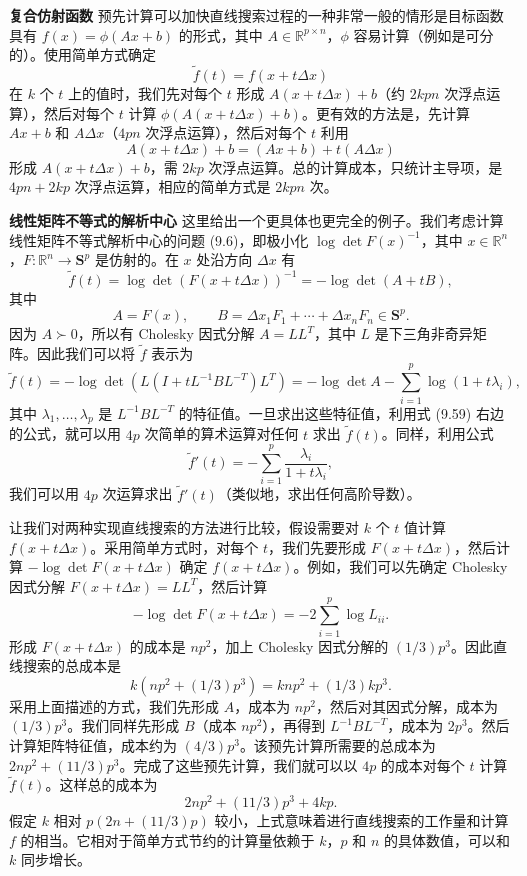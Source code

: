 \documentclass[UTF8, 12pt, fontset=fandol, oneside]{ctexart}
\begin{document}
\noindent\textbf{复合仿射函数}\quad
预先计算可以加快直线搜索过程的一种非常一般的情形是目标函数具有 $f(x)=\phi(Ax+b)$ 的形式，其中 $A\in\mathbb{R}^{p\times n}$，$\phi$ 容易计算（例如是可分的）。使用简单方式确定
\[
\tilde{f}(t)=f(x+t\Delta x)
\]
在 $k$ 个 $t$ 上的值时，我们先对每个 $t$ 形成 $A(x+t\Delta x)+b$（约 $2kpn$ 次浮点运算），然后对每个 $t$ 计算 $\phi(A(x+t\Delta x)+b)$。更有效的方法是，先计算 $Ax+b$ 和 $A\Delta x$（$4pn$ 次浮点运算），然后对每个 $t$ 利用
\[
A(x+t\Delta x)+b=(Ax+b)+t(A\Delta x)
\]
形成 $A(x+t\Delta x)+b$，需 $2kp$ 次浮点运算。总的计算成本，只统计主导项，是 $4pn+2kp$ 次浮点运算，相应的简单方式是 $2kpn$ 次。

\noindent\textbf{线性矩阵不等式的解析中心}\quad
这里给出一个更具体也更完全的例子。我们考虑计算线性矩阵不等式解析中心的问题 (9.6)，即极小化 $\log\det F(x)^{-1}$，其中 $x\in\mathbb{R}^n$，$F:\mathbb{R}^n\to\mathbf{S}^p$ 是仿射的。在 $x$ 处沿方向 $\Delta x$ 有
\[
\tilde{f}(t)=\log\det(F(x+t\Delta x))^{-1}=-\log\det(A+tB),
\]
其中
\[
A=F(x),\qquad B=\Delta x_1F_1+\cdots+\Delta x_nF_n\in\mathbf{S}^p.
\]
因为 $A\succ0$，所以有 Cholesky 因式分解 $A=LL^T$，其中 $L$ 是下三角非奇异矩阵。因此我们可以将 $\tilde{f}$ 表示为
\begin{equation}
\tilde{f}(t)=-\log\det\left(L(I+tL^{-1}BL^{-T})L^T\right)
=-\log\det A-\sum_{i=1}^p\log(1+t\lambda_i),
\tag{9.59}
\end{equation}
其中 $\lambda_1,\ldots,\lambda_p$ 是 $L^{-1}BL^{-T}$ 的特征值。一旦求出这些特征值，利用式 (9.59) 右边的公式，就可以用 $4p$ 次简单的算术运算对任何 $t$ 求出 $\tilde{f}(t)$。同样，利用公式
\[
\tilde{f}'(t)=-\sum_{i=1}^p\frac{\lambda_i}{1+t\lambda_i},
\]
我们可以用 $4p$ 次运算求出 $\tilde{f}'(t)$（类似地，求出任何高阶导数）。

让我们对两种实现直线搜索的方法进行比较，假设需要对 $k$ 个 $t$ 值计算 $f(x+t\Delta x)$。采用简单方式时，对每个 $t$，我们先要形成 $F(x+t\Delta x)$，然后计算 $-\log\det F(x+t\Delta x)$ 确定 $f(x+t\Delta x)$。例如，我们可以先确定 Cholesky 因式分解 $F(x+t\Delta x)=LL^T$，然后计算
\[
-\log\det F(x+t\Delta x)=-2\sum_{i=1}^p\log L_{ii}.
\]
形成 $F(x+t\Delta x)$ 的成本是 $np^2$，加上 Cholesky 因式分解的 $(1/3)p^3$。因此直线搜索的总成本是
\[
k(np^2+(1/3)p^3)=knp^2+(1/3)kp^3.
\]
采用上面描述的方式，我们先形成 $A$，成本为 $np^2$，然后对其因式分解，成本为 $(1/3)p^3$。我们同样先形成 $B$（成本 $np^2$），再得到 $L^{-1}BL^{-T}$，成本为 $2p^3$。然后计算矩阵特征值，成本约为 $(4/3)p^3$。该预先计算所需要的总成本为 $2np^2+(11/3)p^3$。完成了这些预先计算，我们就可以以 $4p$ 的成本对每个 $t$ 计算 $\tilde{f}(t)$。这样总的成本为
\[
2np^2+(11/3)p^3+4kp.
\]
假定 $k$ 相对 $p(2n+(11/3)p)$ 较小，上式意味着进行直线搜索的工作量和计算 $f$ 的相当。它相对于简单方式节约的计算量依赖于 $k$，$p$ 和 $n$ 的具体数值，可以和 $k$ 同步增长。
\end{document}
